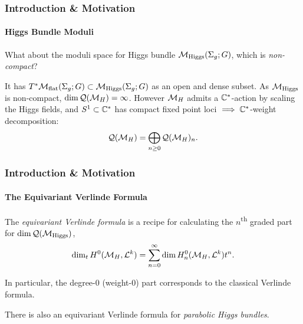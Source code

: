\begin{frame}
	\frametitle{Introduction \& Motivation}
	\framesubtitle{Higgs Bundle Moduli}
	
	\begin{qstn}
		What about the moduli space for Higgs bundle $\mathcal{M}_{\text{Higgs}}(\Sigma_{g};G)$, which is \emph{non-compact}?
	\end{qstn}

	It has $T^{\ast}\mathcal{M}_{\text{flat}}(\Sigma_{g};G) \subset \mathcal{M}_{\text{Higgs}}(\Sigma_{g};G)$ as an open and dense subset.
	As $\mathcal{M}_{\text{Higgs}}$ is non-compact, $\dim \mathcal{Q}(\mathcal{M}_{H}) = \infty$.
	However $\mathcal{M}_{H}$ admits a $\mathbb{C}^{\ast}$-action by scaling the Higgs fields, and $S^{1}\subset \mathbb{C}^{\ast}$ has compact fixed point loci $\implies \mathbb{C}^{\ast}$-weight decomposition:
	$$
	\mathcal{Q}(\mathcal{M}_{H}) = \bigoplus_{n\geq 0}\mathcal{Q}(\mathcal{M}_{H})_{n}.
	$$
	
\end{frame}

\begin{frame}
	\frametitle{Introduction \& Motivation}
	\framesubtitle{The Equivariant Verlinde Formula}

	\begin{prop}
		The \emph{equivariant Verlinde formula} is a recipe for calculating the $n$\textsuperscript{th} graded part for $\dim \mathcal{Q}(\mathcal{M}_{\text{Higgs}})$, \ie 
		$$
			\dim_{t} H^{0}(\mathcal{M}_{H},\mathcal{L}^{k}) = \sum_{n=0}^{\infty}\dim H_{n}^{0}(\mathcal{M}_{H},\mathcal{L}^{k})t^{n}.
		$$
		\end{prop}	
	In particular, the degree-0 (weight-0) part corresponds to the classical Verlinde formula.
	
	\begin{rmk}
		There is also an equivariant Verlinde formula for \emph{parabolic Higgs bundles}.
	\end{rmk}
\end{frame}